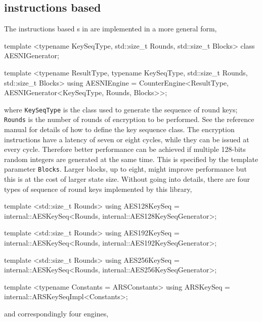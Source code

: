 \subsection{\protect\aesni instructions based \protect\rng}
\label{sub:AES-NI instructions based RNG}

The \aesni instructions based \rng{}s in \textcite{Salmon:2011um} are
implemented in a more general form,
\begin{cppcode}
  template <typename KeySeqType, std::size_t Rounds, std::size_t Blocks>
  class AESNIGenerator;

  template <typename ResultType, typename KeySeqType, std::size_t Rounds,
      std::size_t Blocks>
  using AESNIEngine =
      CounterEngine<ResultType, AESNIGenerator<KeySeqType, Rounds, Blocks>>;
\end{cppcode}
where \verb|KeySeqType| is the class used to generate the sequence of round
keys; \verb|Rounds| is the number of rounds of \aes encryption to be performed.
See the reference manual for details of how to define the key sequence class.
The \aesni encryption instructions have a latency of seven or eight cycles,
while they can be issued at every cycle. Therefore better performance can be
achieved if multiple 128-bits random integers are generated at the same time.
This is specified by the template parameter \verb|Blocks|. Larger blocks, up to
eight, might improve performance but this is at the cost of larger state size.
Without going into details, there are four types of sequence of round keys
implemented by this library,
\begin{cppcode}
  template <std::size_t Rounds>
  using AES128KeySeq =
      internal::AESKeySeq<Rounds, internal::AES128KeySeqGenerator>;

  template <std::size_t Rounds>
  using AES192KeySeq =
      internal::AESKeySeq<Rounds, internal::AES192KeySeqGenerator>;

  template <std::size_t Rounds>
  using AES256KeySeq =
      internal::AESKeySeq<Rounds, internal::AES256KeySeqGenerator>;

  template <typename Constants = ARSConstants>
  using ARSKeySeq = internal::ARSKeySeqImpl<Constants>;
\end{cppcode}
and correspondingly four \rng engines,
